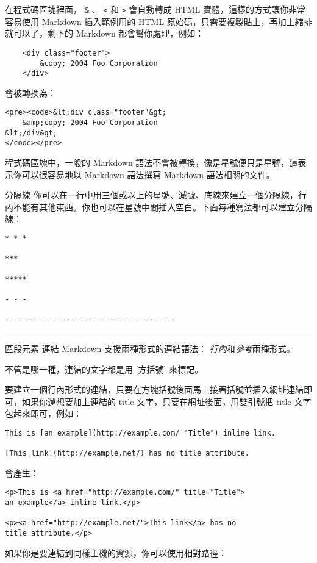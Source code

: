在程式碼區塊裡面， \texttt{\&} 、 \texttt{\textless{}} 和
\texttt{\textgreater{}} 會自動轉成 HTML 實體，這樣的方式讓你非常容易使用
Markdown 插入範例用的 HTML
原始碼，只需要複製貼上，再加上縮排就可以了，剩下的 Markdown
都會幫你處理，例如：

\begin{verbatim}
    <div class="footer">
        &copy; 2004 Foo Corporation
    </div>
\end{verbatim}
會被轉換為：

\begin{verbatim}
<pre><code>&lt;div class="footer"&gt;
    &amp;copy; 2004 Foo Corporation
&lt;/div&gt;
</code></pre>
\end{verbatim}
程式碼區塊中，一般的 Markdown
語法不會被轉換，像是星號便只是星號，這表示你可以很容易地以 Markdown
語法撰寫 Markdown 語法相關的文件。

分隔線
你可以在一行中用三個或以上的星號、減號、底線來建立一個分隔線，行內不能有其他東西。你也可以在星號中間插入空白。下面每種寫法都可以建立分隔線：

\begin{verbatim}
* * *

***

*****

- - -

---------------------------------------
\end{verbatim}
\begin{center}\rule{3in}{0.4pt}\end{center}

區段元素
連結
Markdown 支援兩種形式的連結語法： \emph{行內}和\emph{參考}兩種形式。

不管是哪一種，連結的文字都是用 {[}方括號{]} 來標記。

要建立一個行內形式的連結，只要在方塊括號後面馬上接著括號並插入網址連結即可，如果你還想要加上連結的
title 文字，只要在網址後面，用雙引號把 title 文字包起來即可，例如：

\begin{verbatim}
This is [an example](http://example.com/ "Title") inline link.

[This link](http://example.net/) has no title attribute.
\end{verbatim}
會產生：

\begin{verbatim}
<p>This is <a href="http://example.com/" title="Title">
an example</a> inline link.</p>

<p><a href="http://example.net/">This link</a> has no
title attribute.</p>
\end{verbatim}
如果你是要連結到同樣主機的資源，你可以使用相對路徑：

